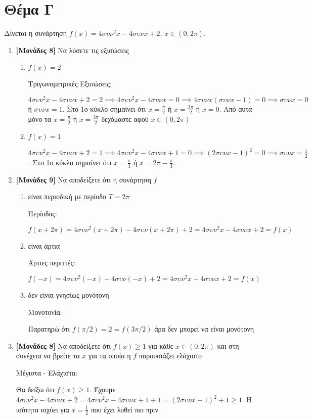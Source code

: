 \documentclass[12pt]{article}
\begin{document}
\section*{Θέμα Γ}
\noindent
Δίνεται η συνάρτηση $f(x)=4συν^2x-4συνx+2$, $x\in (0,2π)$.
\begin{enumerate}
 \item \textbf{[Μονάδες 8]} Να λύσετε τις εξισώσεις
       \begin{enumerate}[label=(\roman*).]
        \item $f(x)=2$

              Τριγωνομετρικές Εξισώσεις:

              $4συν^2x-4συνx+2=2\implies 4συν^2x-4συνx=0 \implies 4συνx(συνx-1)=0 \implies συνx=0$ ή $συνx=1$. Στο 1ο κύκλο σημαίνει ότι $x=\frac{π}{2}$ ή $x=\frac{3π}{2}$ ή $x=0$. Από αυτά μόνο τα $x=\frac{π}{2}$ ή $x=\frac{3π}{2}$ δεχόμαστε αφού $x\in (0,2π)$

        \item $f(x)=1$

              $4συν^2x-4συνx+2=1\implies 4συν^2x-4συνx+1=0 \implies (2συνx-1)^2=0 \implies συνx=\frac{1}{2}$. Στο 1ο κύκλο σημαίνει ότι $x=\frac{π}{3}$ ή $x=2π-\frac{π}{3}$.

       \end{enumerate}
 \item \textbf{[Μονάδες 9]} Να αποδείξετε ότι η συνάρτηση $f$
       \begin{enumerate}[label=\roman*.]
        \item είναι περιοδική με περίοδο $Τ=2π$

              Περίοδος:

              $f(x+2π)=4συν^2(x+2π)-4συν(x+2π)+2=4συν^2x-4συνx+2=f(x)$

        \item είναι άρτια

              Άρτιες περιττές:

              $f(-x)=4συν^2(-x)-4συν(-x)+2=4συν^2x-4συνx+2=f(x)$

        \item δεν είναι γνησίως μονότονη

              Μονοτονία:

              Παρατηρώ ότι $f(π/2)=2=f(3π/2)$ άρα δεν μπορεί να είναι μονότονη

       \end{enumerate}
 \item \textbf{[Μονάδες 8]} Να αποδείξετε ότι $f(x)\ge 1$ για κάθε $x\in (0,2π)$ και στη συνέχεια να βρείτε τα $x$ για τα οποία η $f$ παρουσιάζει ελάχιστο

       Μέγιστα - Ελάχιστα:

       Θα δείξω ότι $f(x)\ge 1$. Έχουμε $4συν^2x-4συνx+2=4συν^2x-4συνx+1+1=(2συνx-1)^2+1\ge 1$. Η ισότητα ισχύει για $x=\frac{1}{2}$ που έχει λυθεί πιο πριν

\end{enumerate}
\end{document}
